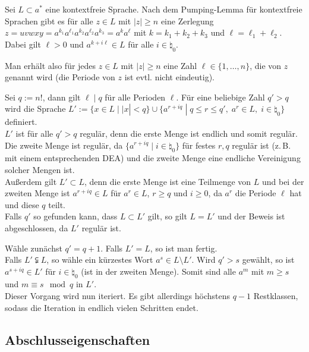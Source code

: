 \begin{Beweis}
    Sei $L \subset a^\ast$ eine kontextfreie Sprache.
    Nach dem Pumping-Lemma für kontextfreie Sprachen gibt es für alle
    $z \in L$ mit $|z| \ge n$ eine Zerlegung $z = uvwxy =
    a^{k_1} a^{\ell_1} a^{k_2} a^{\ell_2} a^{k_3} = a^k a^\ell$ mit
    $k = k_1 + k_2 + k_3$ und $\ell = \ell_1 + \ell_2$.
    Dabei gilt $\ell > 0$ und $a^{k + i\ell} \in L$ für alle
    $i \in \natural_0$.

    Man erhält also für jedes $z \in L$ mit $|z| \ge n$ eine Zahl
    $\ell \in \{1, \dotsc, n\}$, die  von $z$ genannt wird
    (die Periode von $z$ ist evtl. nicht eindeutig).

    Sei $q := n!$, dann gilt $\ell \;|\; q$ für alle Perioden $\ell$.
    Für eine beliebige Zahl $q' > q$ wird die Sprache
    $L' := \{x \in L \;|\; |x| < q\} \cup \{a^{r + iq} \;|\;
    q \le r \le q',\; a^r \in L,\; i \in \natural_0\}$ definiert.\\
    $L'$ ist für alle $q' > q$ regulär, denn
    die erste Menge ist endlich und somit regulär.
    Die zweite Menge ist regulär, da $\{a^{r + iq} \;|\; i \in \natural_0\}$
    für festes $r, q$ regulär ist (z.\,B. mit einem entsprechenden DEA)
    und die zweite Menge eine endliche Vereinigung solcher Mengen ist.\\
    Außerdem gilt $L' \subset L$, denn die erste Menge ist eine Teilmenge von
    $L$ und bei der zweiten Menge ist $a^{r + iq} \in L$ für $a^r \in L$,
    $r \ge q$ und $i \ge 0$, da $a^r$ die Periode $\ell$ hat und diese $q$
    teilt.\\
    Falls $q'$ so gefunden kann, dass $L \subset L'$ gilt, so gilt
    $L = L'$ und der Beweis ist abgeschlossen, da $L'$ regulär ist.

    Wähle zunächst $q' = q + 1$.
    Falls $L' = L$, so ist man fertig.\\
    Falls $L' \subsetneqq L$, so wähle ein kürzestes Wort
    $a^s \in L \setminus L'$.
    Wird $q' > s$ gewählt, so ist $a^{s + iq} \in L'$ für $i \in \natural_0$
    (ist in der zweiten Menge).
    Somit sind alle $a^m$ mit $m \ge s$ und $m \equiv s \mod q$ in $L'$.\\
    Dieser Vorgang wird nun iteriert.
    Es gibt allerdings höchstens $q - 1$ Restklassen, sodass die Iteration in
    endlich vielen Schritten endet.
\end{Beweis}

\pagebreak

\subsection{%
    Abschlusseigenschaften%
}

